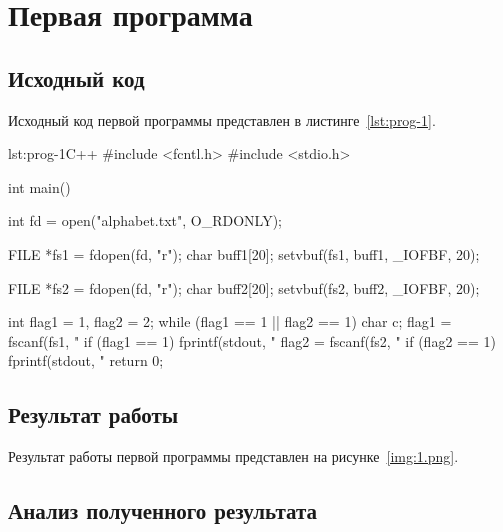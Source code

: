 \section{Первая программа}
\subsection{Исходный код}
Исходный код первой программы представлен в листинге~\ref{lst:prog-1}.

\begin{listing}{lst:prog-1}{C++}
#include <fcntl.h>
#include <stdio.h>

int main()
{
    int fd = open("alphabet.txt", O_RDONLY);

    FILE *fs1 = fdopen(fd, "r");
    char buff1[20];
    setvbuf(fs1, buff1, _IOFBF, 20);

    FILE *fs2 = fdopen(fd, "r");
    char buff2[20];
    setvbuf(fs2, buff2, _IOFBF, 20);

    int flag1 = 1, flag2 = 2;
    while (flag1 == 1 || flag2 == 1)
    {
        char c;
        flag1 = fscanf(fs1, "%
        if (flag1 == 1)
        {
            fprintf(stdout, "%
        }
        flag2 = fscanf(fs2, "%
        if (flag2 == 1)
        {
            fprintf(stdout, "%
        }
    }
    return 0;
}
\end{listing}

\subsection{Результат работы}
Результат работы первой программы представлен на рисунке~\ref{img:1.png}.

\subsection{Анализ полученного результата}


